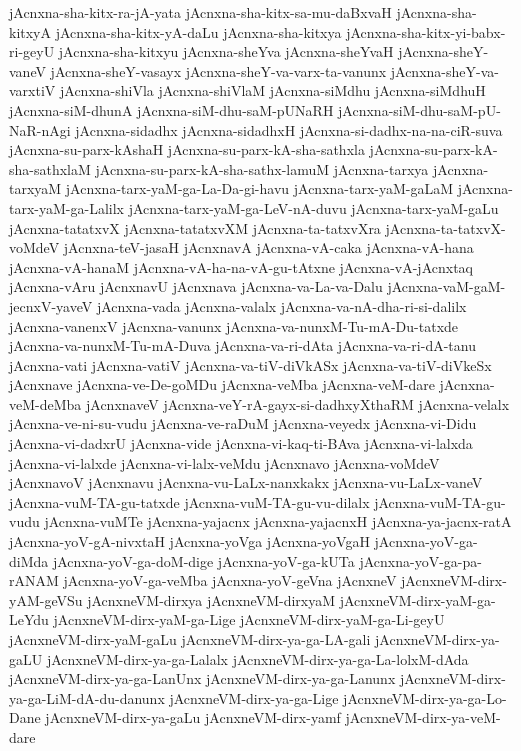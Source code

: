 {jAcnxna-sha-kitx-ra-jA-yata
jAcnxna-sha-kitx-sa-mu-daBxvaH
jAcnxna-sha-kitxyA
jAcnxna-sha-kitx-yA-daLu
jAcnxna-sha-kitxya
jAcnxna-sha-kitx-yi-babx-ri-geyU
jAcnxna-sha-kitxyu
jAcnxna-sheYva
jAcnxna-sheYvaH
jAcnxna-sheY-vaneV
jAcnxna-sheY-vasayx
jAcnxna-sheY-va-varx-ta-vanunx
jAcnxna-sheY-va-varxtiV
jAcnxna-shiVla
jAcnxna-shiVlaM
jAcnxna-siMdhu
jAcnxna-siMdhuH
jAcnxna-siM-dhunA
jAcnxna-siM-dhu-saM-pUNaRH
jAcnxna-siM-dhu-saM-pU-NaR-nAgi
jAcnxna-sidadhx
jAcnxna-sidadhxH
jAcnxna-si-dadhx-na-na-ciR-suva
jAcnxna-su-parx-kAshaH
jAcnxna-su-parx-kA-sha-sathxla
jAcnxna-su-parx-kA-sha-sathxlaM
jAcnxna-su-parx-kA-sha-sathx-lamuM
jAcnxna-tarxya
jAcnxna-tarxyaM
jAcnxna-tarx-yaM-ga-La-Da-gi-havu
jAcnxna-tarx-yaM-gaLaM
jAcnxna-tarx-yaM-ga-Lalilx
jAcnxna-tarx-yaM-ga-LeV-nA-duvu
jAcnxna-tarx-yaM-gaLu
jAcnxna-tatatxvX
jAcnxna-tatatxvXM
jAcnxna-ta-tatxvXra
jAcnxna-ta-tatxvX-voMdeV
jAcnxna-teV-jasaH
jAcnxnavA
jAcnxna-vA-caka
jAcnxna-vA-hana
jAcnxna-vA-hanaM
jAcnxna-vA-ha-na-vA-gu-tAtxne
jAcnxna-vA-jAcnxtaq
jAcnxna-vAru
jAcnxnavU
jAcnxnava
jAcnxna-va-La-va-Dalu
jAcnxna-vaM-gaM-jecnxV-yaveV
jAcnxna-vada
jAcnxna-valalx
jAcnxna-va-nA-dha-ri-si-dalilx
jAcnxna-vanenxV
jAcnxna-vanunx
jAcnxna-va-nunxM-Tu-mA-Du-tatxde
jAcnxna-va-nunxM-Tu-mA-Duva
jAcnxna-va-ri-dAta
jAcnxna-va-ri-dA-tanu
jAcnxna-vati
jAcnxna-vatiV
jAcnxna-va-tiV-diVkASx
jAcnxna-va-tiV-diVkeSx
jAcnxnave
jAcnxna-ve-De-goMDu
jAcnxna-veMba
jAcnxna-veM-dare
jAcnxna-veM-deMba
jAcnxnaveV
jAcnxna-veY-rA-gayx-si-dadhxyXthaRM
jAcnxna-velalx
jAcnxna-ve-ni-su-vudu
jAcnxna-ve-raDuM
jAcnxna-veyedx
jAcnxna-vi-Didu
jAcnxna-vi-dadxrU
jAcnxna-vide
jAcnxna-vi-kaq-ti-BAva
jAcnxna-vi-lalxda
jAcnxna-vi-lalxde
jAcnxna-vi-lalx-veMdu
jAcnxnavo
jAcnxna-voMdeV
jAcnxnavoV
jAcnxnavu
jAcnxna-vu-LaLx-nanxkakx
jAcnxna-vu-LaLx-vaneV
jAcnxna-vuM-TA-gu-tatxde
jAcnxna-vuM-TA-gu-vu-dilalx
jAcnxna-vuM-TA-gu-vudu
jAcnxna-vuMTe
jAcnxna-yajacnx
jAcnxna-yajacnxH
jAcnxna-ya-jacnx-ratA
jAcnxna-yoV-gA-nivxtaH
jAcnxna-yoVga
jAcnxna-yoVgaH
jAcnxna-yoV-ga-diMda
jAcnxna-yoV-ga-doM-dige
jAcnxna-yoV-ga-kUTa
jAcnxna-yoV-ga-pa-rANAM
jAcnxna-yoV-ga-veMba
jAcnxna-yoV-geVna
jAcnxneV
jAcnxneVM-dirx-yAM-geVSu
jAcnxneVM-dirxya
jAcnxneVM-dirxyaM
jAcnxneVM-dirx-yaM-ga-LeYdu
jAcnxneVM-dirx-yaM-ga-Lige
jAcnxneVM-dirx-yaM-ga-Li-geyU
jAcnxneVM-dirx-yaM-gaLu
jAcnxneVM-dirx-ya-ga-LA-gali
jAcnxneVM-dirx-ya-gaLU
jAcnxneVM-dirx-ya-ga-Lalalx
jAcnxneVM-dirx-ya-ga-La-lolxM-dAda
jAcnxneVM-dirx-ya-ga-LanUnx
jAcnxneVM-dirx-ya-ga-Lanunx
jAcnxneVM-dirx-ya-ga-LiM-dA-du-danunx
jAcnxneVM-dirx-ya-ga-Lige
jAcnxneVM-dirx-ya-ga-Lo-Dane
jAcnxneVM-dirx-ya-gaLu
jAcnxneVM-dirx-yamf
jAcnxneVM-dirx-ya-veM-dare
}
